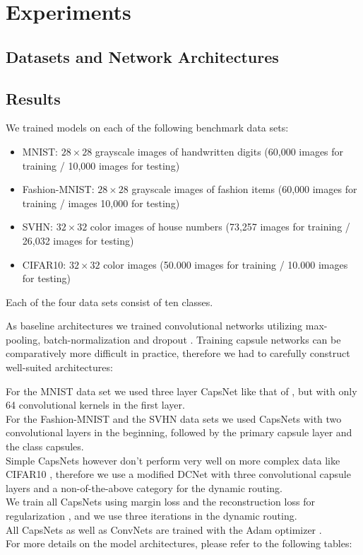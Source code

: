 
\section{Experiments}

\subsection{Datasets and Network Architectures}



\subsection{Results}
 
 We trained models on each of the following benchmark data sets:

\begin{itemize}
	\item MNIST: $28\times28$ grayscale images of handwritten digits (60,000  images for training / 10,000  images for testing) \cite{mnist}
	\item Fashion-MNIST:  $28\times28$ grayscale images of fashion items (60,000 images for training / images 10,000 for testing) \cite{fashion}
	\item SVHN: $32\times32$ color images of house numbers (73,257  images for training / 26,032 images for testing) \cite{svhn}
	\item CIFAR10: $32\times32$ color images (50.000  images for training / 10.000  images for testing) \cite{cifar}
\end{itemize}

Each of the four data sets consist of ten classes.

As baseline architectures we trained convolutional networks utilizing max-pooling,
batch-normalization \citep{batchnorm} and dropout \citep{dropout}.
Training capsule networks can be comparatively more difficult in practice, therefore we had to carefully construct well-suited architectures:

For the MNIST data set we used three layer CapsNet like that of \citet{capsules}, but with only 64 convolutional kernels in the first layer. \\
For the Fashion-MNIST and the SVHN data sets we used CapsNets with two convolutional layers in the beginning, followed by the primary capsule layer and the class capsules. \\
Simple CapsNets however don't perform very well on more complex data like CIFAR10 \citep{complex}, therefore we use a modified DCNet \citep{denseanddiverse} with three convolutional capsule layers and a non-of-the-above category for the dynamic routing. \\
We train all CapsNets using margin loss and the reconstruction loss for regularization \citep{capsules}, and we use three iterations in the dynamic routing. \\
All CapsNets as well as ConvNets are trained with the Adam optimizer \citep{adam}. \\
For more details on the model architectures, please refer to the following tables: 

